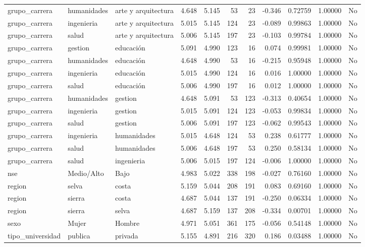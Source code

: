 \documentclass[
  letterpaper,
  DIV=11,
  numbers=noendperiod]{scrartcl}
\begin{document}
\begin{table}
\begin{tabular*}{\linewidth}{@{\extracolsep{\fill}}lllrrrrrrrl}
grupo\_carrera & humanidades & arte y arquitectura & 4.648 & 5.145 & 53 & 23 & -0.346 & 0.72759 & 1.00000 & No \\ 
grupo\_carrera & ingenieria & arte y arquitectura & 5.015 & 5.145 & 124 & 23 & -0.089 & 0.99863 & 1.00000 & No \\ 
grupo\_carrera & salud & arte y arquitectura & 5.006 & 5.145 & 197 & 23 & -0.103 & 0.99784 & 1.00000 & No \\ 
grupo\_carrera & gestion & educación & 5.091 & 4.990 & 123 & 16 & 0.074 & 0.99981 & 1.00000 & No \\ 
grupo\_carrera & humanidades & educación & 4.648 & 4.990 & 53 & 16 & -0.215 & 0.95948 & 1.00000 & No \\ 
grupo\_carrera & ingenieria & educación & 5.015 & 4.990 & 124 & 16 & 0.016 & 1.00000 & 1.00000 & No \\ 
grupo\_carrera & salud & educación & 5.006 & 4.990 & 197 & 16 & 0.012 & 1.00000 & 1.00000 & No \\ 
grupo\_carrera & humanidades & gestion & 4.648 & 5.091 & 53 & 123 & -0.313 & 0.40654 & 1.00000 & No \\ 
grupo\_carrera & ingenieria & gestion & 5.015 & 5.091 & 124 & 123 & -0.053 & 0.99834 & 1.00000 & No \\ 
grupo\_carrera & salud & gestion & 5.006 & 5.091 & 197 & 123 & -0.062 & 0.99543 & 1.00000 & No \\ 
grupo\_carrera & ingenieria & humanidades & 5.015 & 4.648 & 124 & 53 & 0.238 & 0.61777 & 1.00000 & No \\ 
grupo\_carrera & salud & humanidades & 5.006 & 4.648 & 197 & 53 & 0.250 & 0.58134 & 1.00000 & No \\ 
grupo\_carrera & salud & ingenieria & 5.006 & 5.015 & 197 & 124 & -0.006 & 1.00000 & 1.00000 & No \\ 
nse & Medio/Alto & Bajo & 4.983 & 5.022 & 338 & 198 & -0.027 & 0.76160 & 1.00000 & No \\ 
region & selva & costa & 5.159 & 5.044 & 208 & 191 & 0.083 & 0.69160 & 1.00000 & No \\ 
region & sierra & costa & 4.687 & 5.044 & 137 & 191 & -0.250 & 0.06334 & 1.00000 & No \\ 
region & sierra & selva & 4.687 & 5.159 & 137 & 208 & -0.334 & 0.00701 & 1.00000 & No \\ 
sexo & Mujer & Hombre & 4.971 & 5.051 & 361 & 175 & -0.056 & 0.54148 & 1.00000 & No \\ 
tipo\_universidad & publica & privada & 5.155 & 4.891 & 216 & 320 & 0.186 & 0.03488 & 1.00000 & No \\ 

\end{tabular*}
\end{table}
\end{document}
